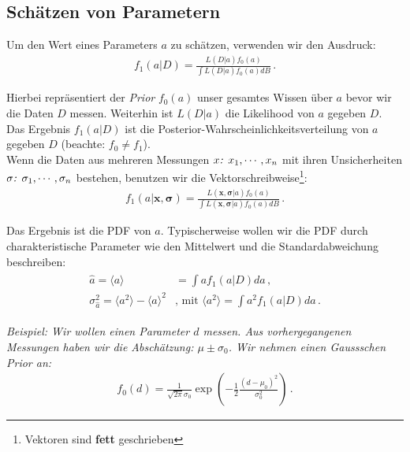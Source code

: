 \subsection{Sch\"atzen von Parametern}
\label{subsec:vl4-10}

Um den Wert eines Parameters $a$ zu sch\"atzen, verwenden wir den Ausdruck:
\begin{align}
f_1 ( a | D ) = \frac{ L ( D | a ) f_0 ( a ) }{ \int L ( D | a ) f_0 ( a ) dB}\,.
\label{eq:vl4-41}
\end{align}

Hierbei repr\"asentiert der \textit{Prior} $f_0 ( a )$ unser gesamtes Wissen \"uber $a$ bevor wir die Daten $D$ messen. Weiterhin ist $L ( D | a )$ die Likelihood von $a$ gegeben $D$. Das Ergebnis $f_1 ( a | D )$ ist die Posterior-Wahrscheinlichkeitsverteilung von $a$ gegeben $D$ (beachte: $f_0 \neq f_1$). \\
Wenn die Daten aus mehreren Messungen $x\text{\textit{:} } x_1, \cdots, x_n$ mit ihren Unsicherheiten $\sigma\text{\textit{:} }  \sigma_1, \cdots, \sigma_n$ bestehen, benutzen wir die Vektorschreibweise\footnote{Vektoren sind \textbf{fett} geschrieben}:
\begin{align}
f_1 ( a | \boldsymbol{x, \sigma} ) = \frac{ L ( \boldsymbol{x, \sigma} | a ) f_0 ( a ) }{ \int L ( \boldsymbol{x, \sigma} | a ) f_0 ( a ) dB}\,.
\label{eq:vl4-42}
\end{align}

Das Ergebnis ist die PDF von $a$. Typischerweise wollen wir die PDF durch charakteristische Parameter wie den Mittelwert und die Standardabweichung beschreiben:
\begin{align}
\begin{split}
\hat{a} = \langle a \rangle & = \int a f_1 ( a | D ) da\,,\\
\sigma_{\hat{a}}^2 = \langle a^2 \rangle - \langle a \rangle^2 & \text{, mit } \langle a^2 \rangle = \int a^2 f_1 ( a | D ) da\,.
\end{split}
\label{eq:vl4-43}
\end{align}

\textit{Beispiel: Wir wollen einen Parameter $d$ messen. Aus vorhergegangenen Messungen haben wir die Absch\"atzung: $\mu \pm \sigma_0$. Wir nehmen einen Gaussschen Prior an:}
\begin{align}
f_0 ( d ) = \frac{ 1 }{ \sqrt{ 2 \pi } \sigma_0 } \exp \left( - \frac{ 1 }{ 2 } \frac{ ( d - \mu_0 )^2 }{ \sigma_0^2 } \right)\,.
\label{eq:vl4-44}
\end{align}

